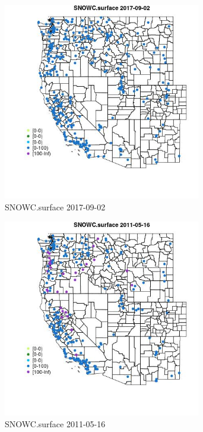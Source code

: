 \begin{figure} 
\centering  
\includegraphics[width=0.77\textwidth]{Code_Outputs/Report_ML_input_PM25_Step4_part_e_de_duplicated_aves_compiled_2019-05-21wNAs_MapObsSNOWCsurface2017-09-02.jpg} 
\caption{\label{fig:Report_ML_input_PM25_Step4_part_e_de_duplicated_aves_compiled_2019-05-21wNAsMapObsSNOWCsurface2017-09-02}SNOWC.surface 2017-09-02} 
\end{figure} 
 

\begin{figure} 
\centering  
\includegraphics[width=0.77\textwidth]{Code_Outputs/Report_ML_input_PM25_Step4_part_e_de_duplicated_aves_compiled_2019-05-21wNAs_MapObsSNOWCsurface2011-05-16.jpg} 
\caption{\label{fig:Report_ML_input_PM25_Step4_part_e_de_duplicated_aves_compiled_2019-05-21wNAsMapObsSNOWCsurface2011-05-16}SNOWC.surface 2011-05-16} 
\end{figure} 
 

